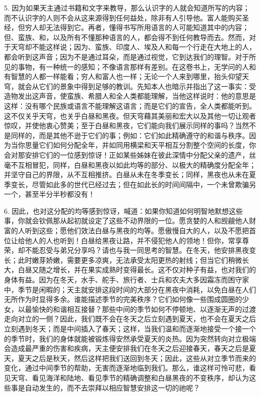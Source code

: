 5. 因为如果天主通过书籍和文字来教导，那么认识字的人就会知道所写的内容；而不认识字的人则不会从这来源得到任何益处，除非有人引导他。富人能购买圣经，但穷人却无法得到它。再者，懂得书写所用语言的人可能知道其中的内容；但、蛮族、和，以及所有不懂那种语言的人，都会得不到任何教导而去。然而，对于天穹却不能这样说；因为、蛮族、印度人、埃及人和每一个行走在大地上的人，都会听到这声音；因为不是通过耳朵，而是通过视觉，它到达我们的理智。对于所见的事物，有一种统一的感知；不像语言那样有差别。在这卷书上，无学问的人和有智慧的人都一样能看；穷人和富人也一样；无论一个人来到哪里，抬头仰望天穹，就会从它们的景象中得到足够的教训。先知本人也暗示并指出了这一事实：受造物发出这声音，使蛮族、希腊人和全人类都能理解，当他这样说时：他的意思是这样：没有哪个民族或语言不能理解这语言；而是它们的宣告，全人类都能听到。这不仅关乎天穹，也关乎白昼和黑夜。但天穹藉其美丽和宏大以及其他一切让观者惊叹，并使他衷心赞美；至于白昼和黑夜，它们能向我们展示同样的事吗？当然不是同样的，而是其他不逊于它们的事；例如：它们如此精确遵守的和谐与秩序。因为当你思量它们如何分配全年，并如同用横梁和天平相互分割整个空间的长度，你会对那安排它们的一位感到惊讶！正如某些姊妹在彼此深情中分配父亲的遗产，丝毫不互相冒犯，同样，白昼和黑夜以如此均等的部分、以极大的精确度分配全年；并坚守自己的界限，从不互相推挤。白昼从未在冬季变长；同样，黑夜也从未在夏季变长，尽管如此多的世代已经过去；但在如此长的时间间隔中，一个未曾欺骗另一个，甚至半分半秒都没有！\par

6. 因此，也对这分配的均等感到惊讶，喊道：如果你知道如何明智地默想这些事，你就会钦佩那从起初就设定了这些不动界限的一位。愿贪婪的人和觊觎他人财富的人听到这些；愿他们效法白昼与黑夜的均等。愿傲慢自大的人，以及不愿把首位让给他人的人也听到！白昼给黑夜让路，并不侵犯他人的领地！但你，常享尊荣，却不能忍受与弟兄分享吗？请也与我一同思考的智慧。在冬天，他安排黑夜变长；此时嫩芽娇嫩，需要更多凉爽，无法承受太阳更热的射线；但当它们稍微长大，白昼又随之增长，并在果实成熟时变得最长。这不仅对种子有益，也对我们的身体有益。因为在冬天，水手、舵手、旅行者、士兵和农夫大多因霜冻而困守家中，季节是闲暇的；天主就安排这段时间的大部分在黑夜中消耗，以免白昼在人们无所作为时显得多余。谁能描述季节的完美秩序？它们如何像一些围成圆圈的少女，以最愉快的和谐相互接替？那些中间的季节如何不停顿地、以逐渐无声的过渡走向对立的一侧？因此，我们既不会在冬天之后立刻遇到夏天，也不会在夏天之后立刻遇到冬天；而是中间插入了春天；这样，当我们温和而逐渐地接受一个接一个的季节时，我们的身体就能被锻炼得安然承受夏天的炎热。因为突然转向对立极端会造成最严重的伤害和疾病，天主便安排我们在冬天之后迎接春天，春天之后是夏天，夏天之后是秋天，然后这样把我们送回到冬天；因此，这些从对立季节而来的变化，通过中间季节的帮助，无害而逐渐地临到我们。那么，谁这样可怜可悲，看见天穹、看见海洋和陆地、看见季节的精确调整和白昼黑夜的不变秩序，却认为这些事是自动发生的，而不去崇拜以相应智慧安排这一切的祂呢？\par


